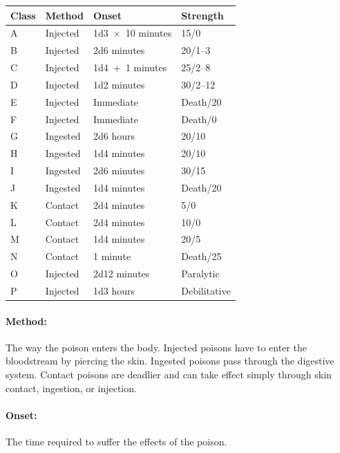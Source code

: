 \begin{multicols}{2}
\begin{minipage}{\columnwidth}
\label{poisonstrength}
\noindent
\begin{tabular}{|p{}|p{}|p{}|p{}|}
\hline
Class	& Method	& Onset	& Strength \\
\hline\hline
\rowcolor[gray]{.9}A	& Injected	& 1d3~$\times$~10 minutes		& 15/0 \\
B	& Injected	& 2d6 minutes		& 20/1--3 \\
\rowcolor[gray]{.9}C	& Injected	& 1d4~+~1 minutes	& 25/2--8 \\
D	& Injected	& 1d2 minutes		& 30/2--12 \\
\rowcolor[gray]{.9}E	& Injected	& Immediate		& Death/20 \\
F	& Injected	& Immediate		& Death/0 \\
\rowcolor[gray]{.9}G	& Ingested	& 2d6 hours		& 20/10 \\
H	& Ingested	& 1d4 minutes		& 20/10 \\
\rowcolor[gray]{.9}I	& Ingested	& 2d6 minutes		& 30/15 \\
J	& Ingested	& 1d4 minutes		& Death/20 \\
\rowcolor[gray]{.9}K	& Contact	& 2d4 minutes		& 5/0 \\
L	& Contact	& 2d4 minutes		& 10/0 \\
\rowcolor[gray]{.9}M	& Contact	& 1d4 minutes		& 20/5 \\
N	& Contact	& 1 minute		& Death/25 \\
\rowcolor[gray]{.9}O	& Injected	& 2d12 minutes	& Paralytic \\
P	& Injected	& 1d3 hours		& Debilitative \\
\hline
\end{tabular}

\end{minipage}

\paragraph{Method:} The way the poison enters the body.  Injected poisons have to enter the bloodstream by piercing the skin.  Ingested poisons pass through the digestive system.  Contact poisons are deadlier and can take effect simply through skin contact, ingestion, or injection.  

\columnbreak

\paragraph{Onset:} The time required to suffer the effects of the poison.


\end{multicols}
